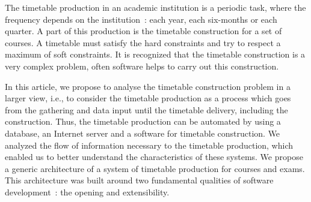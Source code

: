 The timetable production in an academic institution is a periodic
task, where the frequency depends on the institution~: each year,
each six-months or each quarter. A part of this production is the
timetable construction for a set of courses. A timetable must
satisfy the hard constraints and try to respect a maximum of soft
constraints. It is recognized that the timetable construction is a
very complex problem, often software helps to carry out this
construction.

In this article, we propose to analyse the timetable construction
problem in a larger view, i.e., to consider the timetable
production as a process which goes from the gathering and data
input until the timetable delivery, including the construction.
Thus, the timetable production can be automated by using a
database, an Internet server and a software for timetable
construction. We analyzed the flow of information necessary to the
timetable production, which enabled us to better understand the
characteristics of these systems. We propose a generic
architecture of a system of timetable production for courses and
exams. This architecture was built around two fundamental
qualities of software development~: the opening and extensibility.
